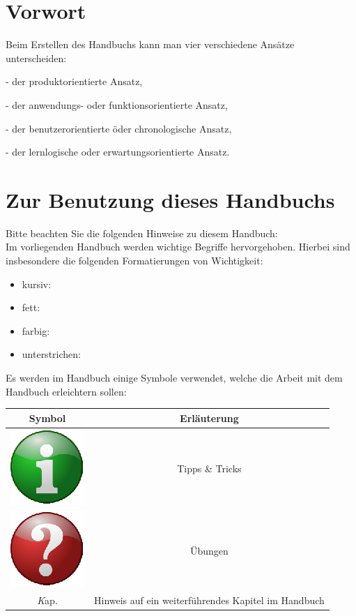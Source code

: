 \documentclass[10pt]{scrreprt}
\newcommand{\textref}[1]{\mbox{\raisebox{0.1ex}{\small$\rightarrow$ }\textit{#1}}}
\begin{document}
\pagebreak
\rmfamily
\tableofcontents


\chapter{Vorwort}

Beim Erstellen des Handbuchs kann man vier verschiedene Ansätze unterscheiden:

- der produktorientierte Ansatz,

- der anwendungs- oder funktionsorientierte Ansatz,

- der benutzerorientierte öder chronologische Ansatz,

- der lernlogische oder erwartungsorientierte Ansatz.


\chapter{Zur Benutzung dieses Handbuchs}
Bitte beachten Sie die folgenden Hinweise zu diesem Handbuch:\\

Im vorliegenden Handbuch werden wichtige Begriffe hervorgehoben. Hierbei sind insbesondere die folgenden Formatierungen von Wichtigkeit:

\begin{itemize}
\item kursiv: 
\item fett:
\item farbig:
\item unterstrichen:
\end{itemize}

Es werden im Handbuch einige Symbole verwendet, welche die Arbeit mit dem Handbuch erleichtern sollen:

\begin{center}
\begin{tabular}{|c|c|}
\hline 
\textbf{Symbol} & \textbf{Erläuterung} \\ 
\hline
\hline
\includegraphics[scale=0.5]{images/info.eps} & Tipps \& Tricks  \\ 
\hline
\includegraphics[scale=0.5]{images/quest.eps} & Übungen \\
\hline
\textref Kap. & Hinweis auf ein weiterführendes Kapitel im Handbuch \\
\hline
\end{tabular}
\end{center}
\end{document}
